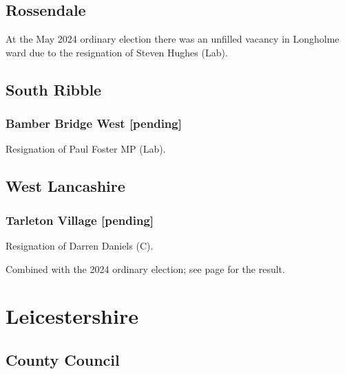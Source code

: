 \documentclass[a4paper,openany]{book}
\begin{document}
\begin{resultsiii}
\subsection*{Rossendale}

At the May 2024 ordinary election there was an unfilled vacancy in Longholme ward due to the resignation of Steven Hughes (Lab).%

\subsection*{South Ribble}

\subsubsection*{Bamber Bridge West \hspace*{\fill}\nolinebreak[1]%
	\enspace\hspace*{\fill}
	[pending]}


Resignation of Paul Foster MP (Lab).

\subsection*{West Lancashire}

\subsubsection*{Tarleton Village \hspace*{\fill}\nolinebreak[1]%
	\enspace\hspace*{\fill}
	[pending]}


Resignation of Darren Daniels (C).

Combined with the 2024 ordinary election; see page \pageref{TarletonVillageWLancs} for the result.

\section{Leicestershire}

\subsection*{County Council}


\end{resultsiii}
\end{document}
